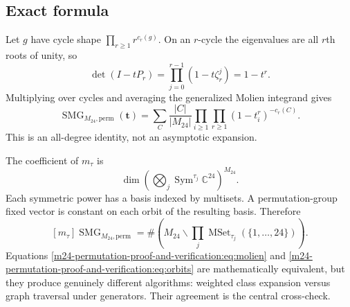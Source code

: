 \documentclass[10pt]{article}
\newcommand{\SMG}{\operatorname{SMG}}
\begin{document}
\begingroup
{}
\providecommand{\Sgm}{\SMG}
\renewcommand{\Sgm}{\SMG}
\setcounter{theorem}{0}
\setcounter{proposition}{0}
\setcounter{lemma}{0}
\setcounter{corollary}{0}
\setcounter{remark}{0}
\begin{abstract}
We prove the cycle-shape formula for the sigma--MGF of the natural
$24$-dimensional permutation representation of $M_{24}$.  Two published
ATLAS permutations are converted into $24\times24$ matrices.  Independent
generator-orbit enumeration is compared with a full conjugacy-class sum.
Agreement holds in every tested case.  The computation also sharpens the
5-transitivity statement: equality with $S_{24}$ holds through total degree
five, while $[m_{(6)}]$ is $12$ rather than $11$ and
$[m_{(1^6)}]$ is $204$ rather than $203$.
\end{abstract}

\subsection{Exact formula}
Let $g$ have cycle shape $\prod_{r\geq1}r^{c_r(g)}$.  On an $r$-cycle the
eigenvalues are all $r$th roots of unity, so
\[
\det(I-tP_r)=\prod_{j=0}^{r-1}(1-t\zeta_r^j)=1-t^r.
\]
Multiplying over cycles and averaging the generalized Molien integrand gives
\begin{equation}\label{m24-permutation-proof-and-verification:eq:molien}
\boxed{
\Sgm_{M_{24},\mathrm{perm}}(\mathbf t)
=\sum_C\frac{|C|}{|M_{24}|}
\prod_{i\geq1}\prod_{r\geq1}(1-t_i^r)^{-c_r(C)}.}
\end{equation}
This is an all-degree identity, not an asymptotic expansion.

The coefficient of $m_\tau$ is
\[
\dim\left(\bigotimes_j\operatorname{Sym}^{\tau_j}\mathbb C^{24}\right)^{M_{24}}.
\]
Each symmetric power has a basis indexed by multisets.  A permutation-group
fixed vector is constant on each orbit of the resulting basis.  Therefore
\begin{equation}\label{m24-permutation-proof-and-verification:eq:orbits}
[m_\tau]\Sgm_{M_{24},\mathrm{perm}}
=\#\left(M_{24}\backslash\prod_j
\operatorname{MSet}_{\tau_j}(\{1,\ldots,24\})\right).
\end{equation}
Equations \eqref{m24-permutation-proof-and-verification:eq:molien} and \eqref{m24-permutation-proof-and-verification:eq:orbits} are mathematically
equivalent, but they produce genuinely different algorithms: weighted class
expansion versus graph traversal under generators.  Their agreement is the
central cross-check.
\end{document}
